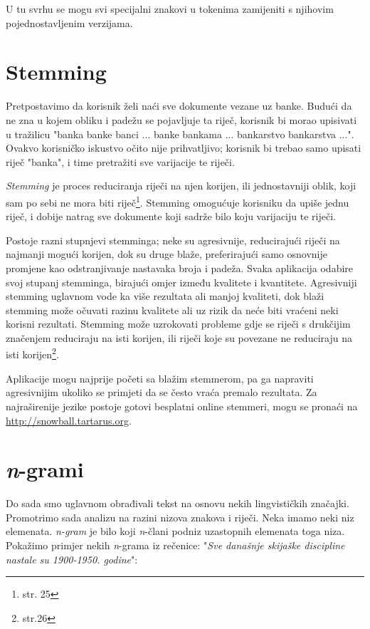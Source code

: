 \documentclass[11pt]{scrreprt}
\begin{document}
U tu svrhu se mogu svi specijalni znakovi u tokenima zamijeniti s njihovim pojednostavljenim verzijama.

\section{Stemming}

Pretpostavimo da korisnik želi naći sve dokumente vezane uz banke. Budući da ne zna u kojem obliku i padežu se pojavljuje ta riječ, korisnik bi morao upisivati u tražilicu "banka banke banci ... banke bankama ... bankarstvo bankarstva ...". Ovakvo korisničko iskustvo očito nije prihvatljivo; korisnik bi trebao samo upisati riječ "banka", i time pretražiti sve varijacije te riječi.

\textit{Stemming} je proces reduciranja riječi na njen korijen, ili jednostavniji oblik, koji sam po sebi ne mora biti riječ\footnote{\cite{taming} str. 25}. Stemming omogućuje korisniku da upiše jednu riječ, i dobije natrag sve dokumente koji sadrže bilo koju varijaciju te riječi.

Postoje razni stupnjevi stemminga; neke su agresivnije, reducirajući riječi na najmanji mogući korijen, dok su druge blaže, preferirajući samo osnovnije promjene kao odstranjivanje nastavaka broja i padeža. Svaka aplikacija odabire svoj stupanj stemminga, birajući omjer između kvalitete i kvantitete. Agresivniji stemming uglavnom vode ka više rezultata ali manjoj kvaliteti, dok blaži stemming može očuvati razinu kvalitete ali uz rizik da neće biti vraćeni neki korisni rezultati. Stemming može uzrokovati probleme gdje se riječi s drukčijim značenjem reduciraju na isti korijen, ili riječi koje su povezane ne reduciraju na isti korijen\footnote{\cite{taming} str.26}.

Aplikacije mogu najprije početi sa blažim stemmerom, pa ga napraviti agresivnijim ukoliko se primjeti da se često vraća premalo rezultata. Za najraširenije jezike postoje gotovi besplatni online stemmeri, mogu se pronaći na \url{http://snowball.tartarus.org}.

\section{\textit{n}-grami}

Do sada smo uglavnom obrađivali tekst na osnovu nekih lingvističkih značajki. Promotrimo sada analizu na razini nizova znakova i riječi. Neka imamo neki niz elemenata. \textit{n-gram} je bilo koji \textit{n}-člani podniz uzastopnih elemenata toga niza. Pokažimo primjer nekih \textit{n}-grama iz rečenice: "\textit{Sve današnje skijaške discipline nastale su 1900-1950. godine}":
\end{document}
